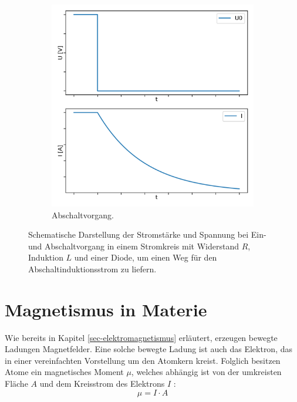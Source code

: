 \documentclass[page,pdftex,12pt,a4paper,twoside,openright]{scrbook}
\begin{document}
\begin{figure}
\begin{subfigure}[b]{0.49\textwidth}
\centering
\includegraphics[width=\textwidth]{./img/ausschalten.png}
\caption{Abschaltvorgang.}
\label{fig-abschalten}
\end{subfigure}
\caption{Schematische Darstellung der Stromstärke und Spannung bei Ein- und Abschaltvorgang in einem Stromkreis mit Widerstand $R$, Induktion $L$ und einer Diode, um einen Weg für den Abschaltinduktionsstrom zu liefern.}
\end{figure}

\section{Magnetismus in Materie \label{sec-magnetismus}}
\label{sec:org9d59946}
Wie bereits in Kapitel \ref{sec-elektromagnetismus} erläutert, erzeugen bewegte Ladungen Magnetfelder. Eine solche bewegte Ladung ist auch das Elektron, das in einer vereinfachten Vorstellung um den Atomkern kreist. Folglich besitzen Atome ein magnetisches Moment \(\mu\), welches abhängig ist von der umkreisten Fläche \(A\) und dem Kreisstrom des Elektrons \(I\) \cite{kassing_bergmann_2005}:\\

\begin{equation}
\label{eq-moment:}
\mu = I \cdot A
\end{equation}
\end{document}
